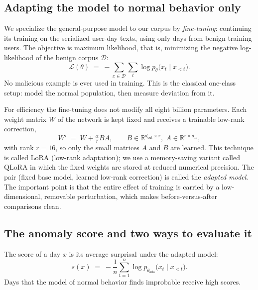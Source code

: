 \documentclass[10pt]{article}
\begin{document}
\subsection{Adapting the model to normal behavior only}

We specialize the general-purpose model to our corpus by
\emph{fine-tuning}: continuing its training on the serialized user-day
texts, using only days from benign training users. The objective is
maximum likelihood, that is, minimizing the negative log-likelihood of
the benign corpus $\mathcal{D}$:
\begin{equation}
\mathcal{L}(\theta) \;=\; -\sum_{x \in \mathcal{D}} \sum_{t}
\log p_\theta\bigl(x_t \mid x_{<t}\bigr).
\end{equation}
No malicious example is ever used in training. This is the classical
one-class setup: model the normal population, then measure deviation
from it.

For efficiency the fine-tuning does not modify all eight billion
parameters. Each weight matrix $W$ of the network is kept fixed and
receives a trainable low-rank correction,
\begin{equation}
W' \;=\; W + \tfrac{\alpha}{r} BA, \qquad
B \in \mathbb{R}^{d_{\mathrm{out}} \times r},\;
A \in \mathbb{R}^{r \times d_{\mathrm{in}}},
\end{equation}
with rank $r = 16$, so only the small matrices $A$ and $B$ are learned.
This technique is called LoRA (low-rank adaptation); we use a
memory-saving variant called QLoRA in which the fixed weights are
stored at reduced numerical precision. The pair (fixed base model,
learned low-rank correction) is called the \emph{adapted model}. The
important point is that the entire effect of training is carried by a
low-dimensional, removable perturbation, which makes before-versus-after
comparisons clean.

\subsection{The anomaly score and two ways to evaluate it}
\label{sec:protocols}

The score of a day $x$ is its average surprisal under the adapted
model:
\begin{equation}
s(x) \;=\; -\frac{1}{n}\sum_{t=1}^{n} \log
p_{\theta_{\mathrm{ada}}}\bigl(x_t \mid x_{<t}\bigr).
\end{equation}
Days that the model of normal behavior finds improbable receive high
scores.
\end{document}
